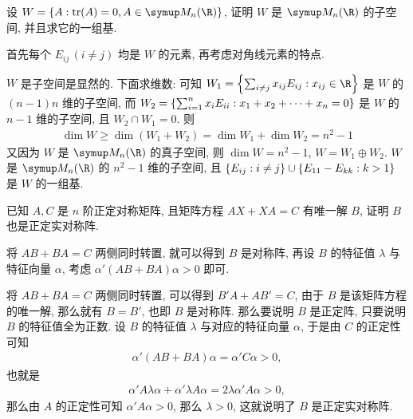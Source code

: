 \begin{exercise}[resume=exer]
      \item 设 $ W = \set{A : \tr(A) = 0, A \in \MM} $, 证明 $ W $ 是 $ \MM $ 的子空间, 并且求它的一组基.
      \begin{hint}
          首先每个 $ E_{ij}\,(i \ne j) $ 均是 $ W $ 的元素, 再考虑对角线元素的特点.
      \end{hint}
      \begin{answer}
          $ W $ 是子空间是显然的. 下面求维数: 可知 $ W_{1} = \set{\sum_{i \ne j} x_{ij}E_{ij} : x_{ij} \in \R} $ 是 $ W $ 的 $ (n - 1)n $ 维的子空间, 而 $ W_{2} = \qty{\sum_{i = 1}^{n} x_{i}E_{ii} : x_{1} + x_{2} + \dots + x_{n} = 0} $ 是 $ W  $ 的 $ n - 1 $ 维的子空间, 且 $ W_{2} \cap W_{1} = 0 $. 则
          \begin{align*}
              \dim W \ge \dim(W_{1} + W_{2}) = \dim W_{1} + \dim W_{2} = n^{2} - 1
          \end{align*}
          又因为 $ W $ 是 $ \MM $ 的真子空间, 则 $ \dim W = n^{2} - 1 $, $ W = W_{1} \oplus W_{2} $.
          $ W $ 是 $ \MM $ 的 $ n^{2} - 1 $ 维的子空间, 且 $ \qty{E_{ij} : i \ne j} \cup \qty{E_{11} - E_{kk} : k > 1} $ 是 $ W $ 的一组基.
      \end{answer}
      \item 已知 $ A, C $ 是 $ n $ 阶正定对称矩阵, 且矩阵方程 $ AX + XA = C $ 有唯一解 $ B $, 证明 $ B $ 也是正定实对称阵.
      \begin{hint}
          将 $ AB + BA = C $ 两侧同时转置, 就可以得到 $ B $ 是对称阵, 再设 $ B $ 的特征值 $ \lambda $ 与特征向量 $ \alpha $, 考虑 $ \alpha'(AB + BA)\alpha > 0 $ 即可.
      \end{hint}
      \begin{answer}
          将 $ AB + BA = C $ 两侧同时转置, 可以得到 $ B'A + AB' = C $, 由于 $ B $ 是该矩阵方程的唯一解, 那么就有 $ B = B' $, 也即 $ B $ 是对称阵. 那么要说明 $ B $ 是正定阵, 只要说明 $ B $ 的特征值全为正数. 设 $ B $ 的特征值 $ \lambda $ 与对应的特征向量 $ \alpha $, 于是由 $ C $ 的正定性可知
          \begin{align*}
              \alpha'(AB + BA)\alpha = \alpha'C\alpha > 0,
          \end{align*}
          也就是
          \begin{align*}
              \alpha'A\lambda\alpha + \alpha'\lambda A\alpha = 2\lambda\alpha' A\alpha > 0,
          \end{align*}
          那么由 $ A $ 的正定性可知 $ \alpha' A\alpha > 0 $, 那么 $ \lambda > 0 $, 这就说明了 $ B $ 是正定实对称阵.
      \end{answer}

\end{exercise}

